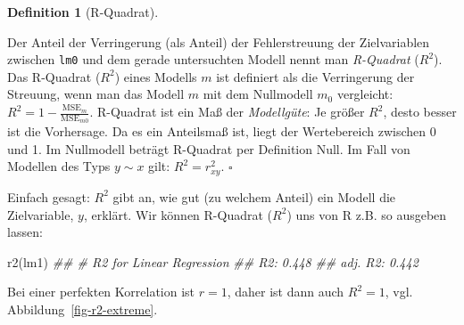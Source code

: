 \documentclass[
  letterpaper,
  twoside,
  open=any]{scrbook}
\newenvironment{Shaded}{\begin{snugshade}}{\end{snugshade}}
\newcommand{\DocumentationTok}[1]{\textcolor[rgb]{0.37,0.37,0.37}{\textit{#1}}}
\newcommand{\FunctionTok}[1]{\textcolor[rgb]{0.28,0.35,0.67}{#1}}
\newcommand{\NormalTok}[1]{\textcolor[rgb]{0.00,0.23,0.31}{#1}}
\theoremstyle{definition}
\theoremstyle{definition}
\theoremstyle{definition}
\newtheorem{definition}{Definition}[chapter]
\theoremstyle{remark}
\begin{document}
\begin{definition}[R-Quadrat]\protect\hypertarget{def-r2}{}\label{def-r2}

Der Anteil der Verringerung (als Anteil) der Fehlerstreuung der
Zielvariablen zwischen \texttt{lm0} und dem gerade untersuchten Modell
nennt man \emph{R-Quadrat} (\(R^2\)). Das R-Quadrat (\(R^2\)) eines
Modells \(m\) ist definiert als die Verringerung der Streuung, wenn man
das Modell \(m\) mit dem Nullmodell \(m_0\) vergleicht:
\(R^2 =1-  \frac{\text{MSE}_{m}}{\text{MSE}_{m0}}\). R-Quadrat ist ein
Maß der \emph{Modellgüte}: Je größer \(R^2\), desto besser ist die
Vorhersage. Da es ein Anteilsmaß ist, liegt der Wertebereich zwischen 0
und 1. Im Nullmodell beträgt R-Quadrat per Definition Null. Im Fall von
Modellen des Typs \(y\sim x\) gilt: \(R^2 = r_{xy}^2\). \(\square\)

\end{definition}

Einfach gesagt: \(R^2\) gibt an, wie gut (zu welchem Anteil) ein Modell
die Zielvariable, \(y\), erklärt. Wir können R-Quadrat (\(R^2\)) uns von
R z.B. so ausgeben lassen:

\begin{Shaded}
\begin{Highlighting}[]
\FunctionTok{r2}\NormalTok{(lm1)}
\DocumentationTok{\#\# \# R2 for Linear Regression}
\DocumentationTok{\#\#        R2: 0.448}
\DocumentationTok{\#\#   adj. R2: 0.442}
\end{Highlighting}
\end{Shaded}

Bei einer perfekten Korrelation ist \(r=1\), daher ist dann auch
\(R^2 = 1\), vgl. Abbildung~\ref{fig-r2-extreme}.
\end{document}

